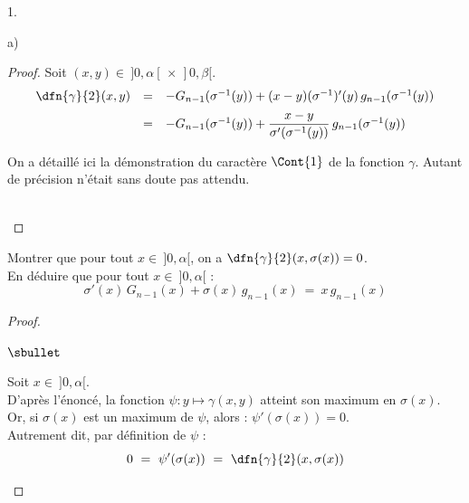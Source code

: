 \documentclass[11pt]{article}%
\begin{document}
\begin{noliste}{1.}
\begin{noliste}{a)}
\begin{proof}
      Soit $(x,y) \in \ ]0,\alpha[ \, \times \, ]0,\beta[$.
      \[
       \begin{array}{rcl}
        \dfn{\gamma}{2}(x,y) & = & - G_{n-1}(\sigma^{-1}(y)) +
        (x-y) (\sigma^{-1})'(y) \, g_{n-1}(\sigma^{-1}(y))
        \\[.2cm]
        & = & - G_{n-1}(\sigma^{-1}(y)) + \dfrac{x-y}{\sigma'(\sigma^{-1}
        (y))} \, g_{n-1}(\sigma^{-1}(y))
       \end{array}
      \]
      \conc{$\forall (x,y) \in \ ]0,\alpha[ \, \times \, ]0,\beta[$,
      $\dfn{\gamma}{2}(x,y) \ = \ - G_{n-1}(\sigma^{-1}(y)) + 
      \dfrac{x-y}{\sigma'(\sigma^{-1}
      (y))} \, g_{n-1}(\sigma^{-1}(y))$}
      
      \begin{remark}
        On a détaillé ici la démonstration du caractère $\Cont{1}$
        de la fonction $\gamma$. Autant de précision n'était 
        sans doute pas attendu.
      \end{remark}~\\[-1.4cm]
    \end{proof}

    \item Montrer que pour tout $x \in \ ]0, \alpha[$, on a 
    $\dfn{\gamma}{2}(x, \sigma(x))=0$.\\
    En déduire que pour tout $x \in \ ]0, \alpha[$ : 
    \[
      \sigma'(x) \, G_{n-1}(x) + \sigma(x) \, g_{n-1}(x) \ = \
      x \, g_{n-1}(x)
    \]
    
    \begin{proof}~
      \begin{noliste}{$\sbullet$}
	\item Soit $x \in \ ]0,\alpha[$.\\
	D'après l'énoncé, la fonction $\psi : y \mapsto 
	\gamma(x,y)$ atteint son maximum en $\sigma(x)$.\\
	Or, si $\sigma(x)$ est un maximum de $\psi$, alors : 
	$\psi'(\sigma(x))=0$.\\
	Autrement dit, par définition de $\psi$ :
	\[
	  0 \ = \ \psi'(\sigma(x)) \ = \ \dfn{\gamma}{2}(x, \sigma(x))
	\]
	\conc{$\forall x \in \ ]0,\alpha[$, $\dfn{\gamma}{2}(x,
	\sigma(x)) = 0$}
	
	
	\newpage
	

\end{noliste}
\end{proof}
\end{noliste}
\end{noliste}
\end{document}
